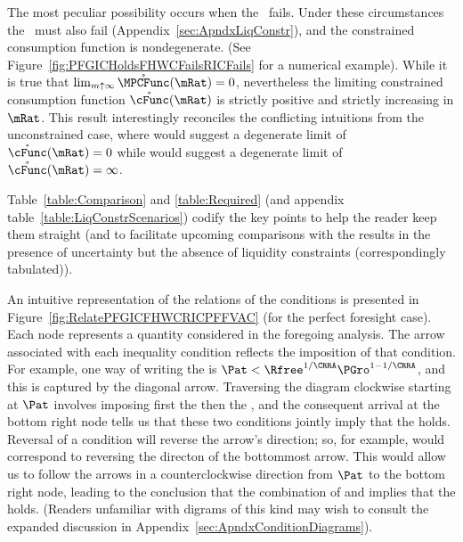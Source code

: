 \documentclass[BufferStockTheory]{subfiles}
\begin{document}
\hypertarget{RICandFHWCFail}{}
The most peculiar possibility occurs when the \RIC~fails.  Under these circumstances the \FHWC~must also fail (Appendix~\ref{sec:ApndxLiqConstr}), and the constrained consumption function is nondegenerate.  (See Figure~\ref{fig:PFGICHoldsFHWCFailsRICFails} for a numerical example).  While it is true that $\lim_{m \uparrow \infty}
\mathring{\MPCFunc}(\mRat) = 0$, nevertheless the limiting constrained
consumption function $\mathring{\cFunc}(\mRat)$ is strictly positive
and strictly increasing in $\mRat$.  This result interestingly
reconciles the conflicting intuitions from the unconstrained case,
where \cncl{\RIC} would suggest a degenerate limit of
$\mathring{\cFunc}(\mRat)=0$ while \cncl{\FHWC} would suggest a
degenerate limit of $\mathring{\cFunc}(\mRat)=\infty$.

Table~\ref{table:Comparison} and \ref{table:Required} (and appendix table~\ref{table:LiqConstrScenarios}) codify the key points to help the reader keep them straight (and to facilitate upcoming comparisons with the results in the presence of uncertainty but the absence of liquidity constraints (correspondingly tabulated)).

An intuitive representation of the relations of the conditions is presented in Figure~\ref{fig:RelatePFGICFHWCRICPFFVAC} (for the perfect foresight case).  Each node represents a quantity considered in the foregoing analysis.  The arrow associated with each inequality condition reflects the imposition of that condition.  For example, one way of writing the {\PFFVAC} is $\Pat < \Rfree^{1/\CRRA} \PGro^{1-1/\CRRA}$, and this is captured by the diagonal arrow.  Traversing the diagram clockwise starting at $\Pat$ involves imposing first the {\PFGIC} then the {\FHWC}, and the consequent arrival at the bottom right node tells us that these two conditions jointly imply that the {\PFFVAC} holds.  Reversal of a condition will reverse the arrow's direction; so, for example, {\cncl{\FHWC}} would correspond to reversing the directon of the bottommost arrow.  This would allow us to follow the arrows in a counterclockwise direction from $\Pat$ to the bottom right node, leading to the conclusion that the combination of {\RIC} and  implies that the \PFFVAC holds.  (Readers unfamiliar with digrams of this kind may wish to consult the expanded discussion in Appendix~\ref{sec:ApndxConditionDiagrams}).

\providecommand{\figName}{RelatePFGICFHWCRICPFFVAC} %
\providecommand{\figFile}{\figName} %
\hypertarget{\figFile}{}
\hypertarget{\figName}{}
\end{document}
